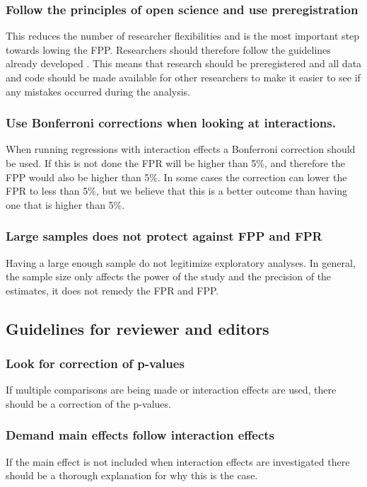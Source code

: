 \subsubsection{Follow the principles of open science and use preregistration}
This reduces the number of researcher flexibilities and is the most important step towards lowing the FPP. Researchers should therefore follow the guidelines already developed \citep{Nosek2015}. This means that research should be preregistered and all data and code should be made available for other researchers to make it easier to see if any mistakes occurred during the analysis. 
\subsubsection{Use Bonferroni corrections when looking at interactions.}
When running regressions with interaction effects a Bonferroni correction should be used. If this is not done the FPR will be higher than 5\%, and therefore the FPP would also be higher than 5\%. In some cases the correction can lower the FPR to less than 5\%, but we believe that this is a better outcome than having one that is higher than 5\%. 
\subsubsection{Large samples does not protect against FPP and FPR}
Having a large enough sample do not legitimize exploratory analyses. In general, the sample size only affects the power of the study and the precision of the estimates, it does not remedy the FPR and FPP. 

\subsection{Guidelines for reviewer and editors}

\subsubsection{Look for correction of p-values}
If multiple comparisons are being made or interaction effects are used, there should be a correction of the p-values.
\subsubsection{Demand main effects follow interaction effects}
If the main effect is not included when interaction effects are investigated there should be a thorough explanation for why this is the case.

